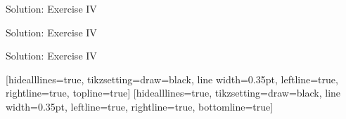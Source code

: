 \begin{frame}{Solution: Exercise IV}
    \begin{listing}[H]
        \caption{Solution for Exercise IV (\texttt{loop()}).}
        \label{lst:arduino:exercise:4:solution:part:3}
    \end{listing}
\end{frame}

\begin{frame}{Solution: Exercise IV}
    \begin{listing}[H]
        \caption{Example output of solution for Exercise IV.}
        \label{lst:arduino:exercise:4:solution:output:part:1}
    \end{listing}
\end{frame}

\begin{frame}{Solution: Exercise IV}
    \begin{listing}[H]
        [hidealllines=true, tikzsetting={draw=black, line width=0.35pt}, leftline=true, rightline=true, topline=true]
        \vspace{-1.25em}
        [hidealllines=true, tikzsetting={draw=black, line width=0.35pt}, leftline=true, rightline=true, bottomline=true]
        \caption{Example output of solution for Exercise IV.}
        \label{lst:arduino:exercise:4:solution:output:part:2}
    \end{listing}
\end{frame}